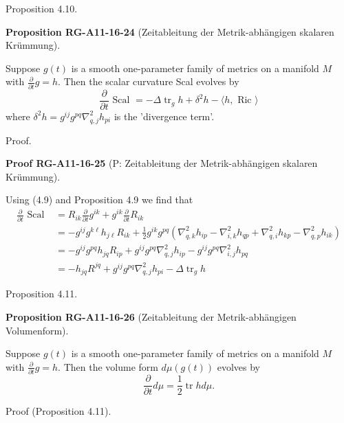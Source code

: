 \documentclass[10pt, letterpaper]{article}
\newcommand{\CustomHeading}[3]{%
  \par\medskip\noindent%
  \textbf{#1 #2} \textnormal{(#3)}.\enskip%
}
\newenvironment{PROP}[2]{\begin{unitbox}\CustomHeading{Proposition}{#1}{#2}}{\end{unitbox}}
\newenvironment{PROOF}[2]{\begin{unitbox}\CustomHeading{Proof}{#1}{#2}}{\end{unitbox}}
\begin{document}
Proposition 4.10. 

\begin{PROP}{RG-A11-16-24}{Zeitableitung der Metrik-abhängigen skalaren Krümmung}
Suppose $g(t)$ is a smooth one-parameter family of metrics on a manifold $M$ with $\frac{\partial}{\partial t} g=h$. Then the scalar curvature Scal evolves by
$$
\frac{\partial}{\partial t} \text { Scal }=-\Delta \operatorname{tr}_{g} h+\delta^{2} h-\langle h, \text { Ric }\rangle
$$
where $\delta^{2} h=g^{i j} g^{p q} \nabla_{q, j}^{2} h_{p i}$ is the 'divergence term'.
\end{PROP}


Proof. 

\begin{PROOF}{RG-A11-16-25}{P: Zeitableitung der Metrik-abhängigen skalaren Krümmung}
Using (4.9) and Proposition 4.9 we find that
$$
\begin{aligned}
\frac{\partial}{\partial t} \text { Scal } & =R_{i k} \frac{\partial}{\partial t} g^{i k}+g^{i k} \frac{\partial}{\partial t} R_{i k} \\
& =-g^{i j} g^{k \ell} h_{j \ell} R_{i k}+\frac{1}{2} g^{i k} g^{p q}\left(\nabla_{q, k}^{2} h_{i p}-\nabla_{i, k}^{2} h_{q p}+\nabla_{q, i}^{2} h_{k p}-\nabla_{q, p}^{2} h_{i k}\right) \\
& =-g^{i j} g^{p q} h_{j q} R_{i p}+g^{i j} g^{p q} \nabla_{q, j}^{2} h_{i p}-g^{i j} g^{p q} \nabla_{i, j}^{2} h_{p q} \\
& =-h_{j q} R^{j q}+g^{i j} g^{p q} \nabla_{q, j}^{2} h_{p i}-\Delta \operatorname{tr}_{g} h
\end{aligned}
$$
\end{PROOF}



Proposition 4.11. 

\begin{PROP}{RG-A11-16-26}{Zeitableitung der Metrik-abhängigen Volumenform}
Suppose $g(t)$ is a smooth one-parameter family of metrics on a manifold $M$ with $\frac{\partial}{\partial t} g=h$. Then the volume form $d \mu(g(t))$ evolves by
$$
\frac{\partial}{\partial t} d \mu=\frac{1}{2} \operatorname{tr} h d \mu .
$$
\end{PROP}


Proof (Proposition 4.11). 
\end{document}
